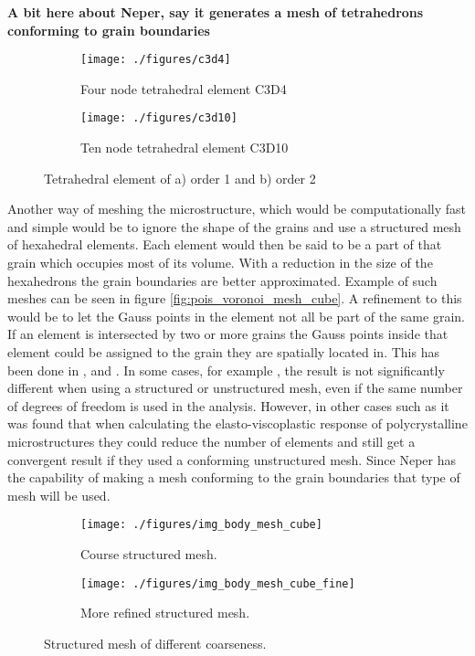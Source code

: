 \documentclass[meshing_micro.tex]{subfiles}
\begin{document}
 \textbf{A bit here about Neper, say it generates a mesh of tetrahedrons conforming to grain boundaries }


\begin{figure}
\centering
\begin{subfigure}[b]{.5\textwidth}
  \centering
  \texttt{[image: ./figures/c3d4]}
  \caption{Four node tetrahedral element C3D4}
  \label{fig:mesh_a}
\end{subfigure}%
\begin{subfigure}[b]{.5\textwidth}
  \centering
  \texttt{[image: ./figures/c3d10]}
  \caption{Ten node tetrahedral element C3D10}
  \label{fig:mesh_b}
\end{subfigure}
\caption{Tetrahedral element of a) order 1 and b) order 2}
\label{fig:mesh}
\end{figure}



Another way of meshing the microstructure, which would be computationally fast and simple would be to ignore the shape of the grains and use a structured mesh of hexahedral elements. Each element would then be said to be a part of that grain which occupies most of its volume. With a reduction in the size of the hexahedrons the grain boundaries are better approximated.   Example of such meshes can be seen in figure \ref{fig:pois_voronoi_mesh_cube}. A refinement to this would be to let the Gauss points in the element not all be part of the same grain. If an element is intersected by two or more grains the Gauss points inside that element could be assigned to the grain they are spatially located in. This has been done in \cite{Nygards20031049}, \cite{Cailletaud2003351} and \cite{Barbe2001513}. In some cases, for example \cite{Bohlke201011}, the result is not significantly different when using a structured or unstructured mesh, even if the same number of degrees of freedom is used in the analysis. However, in other cases such as \cite{Li20091163} it was found that when calculating the elasto-viscoplastic response of polycrystalline microstructures they could reduce the number of elements and still get a convergent result if they used a conforming unstructured mesh. Since Neper has the capability of making a mesh conforming to the grain boundaries that type of mesh will be used. 


\begin{figure}
\centering
\begin{subfigure}[b]{.5\textwidth}
  \centering
  \texttt{[image: ./figures/img\_body\_mesh\_cube]}
  \caption{Course structured mesh.}
  \label{fig:mesh_a}
\end{subfigure}%
\begin{subfigure}[b]{.5\textwidth}
  \centering
  \texttt{[image: ./figures/img\_body\_mesh\_cube\_fine]}
  \caption{More refined structured mesh.}
  \label{fig:mesh_b}
\end{subfigure}
\caption{Structured mesh of different coarseness.}
\label{fig:mesh}
\end{figure}
\end{document}
